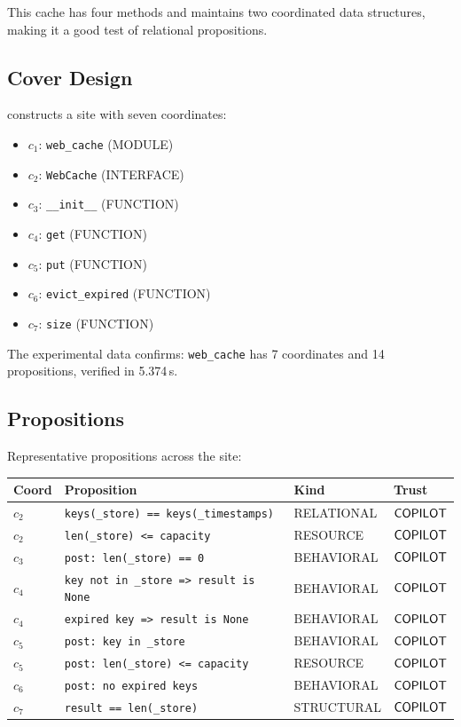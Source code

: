 \documentclass[11pt]{article}
\begin{document}
This cache has four methods and maintains two coordinated data
structures, making it a good test of relational propositions.

\subsection{Cover Design}

\JuGeo{} constructs a site with seven coordinates:
\begin{itemize}
  \item $c_1$: \texttt{web\_cache} (MODULE)
  \item $c_2$: \texttt{WebCache} (INTERFACE)
  \item $c_3$: \texttt{\_\_init\_\_} (FUNCTION)
  \item $c_4$: \texttt{get} (FUNCTION)
  \item $c_5$: \texttt{put} (FUNCTION)
  \item $c_6$: \texttt{evict\_expired} (FUNCTION)
  \item $c_7$: \texttt{size} (FUNCTION)
\end{itemize}

The experimental data confirms: \texttt{web\_cache} has 7 coordinates
and 14 propositions, verified in 5.374\,s.

\subsection{Propositions}

Representative propositions across the site:

\begin{center}
\small
\begin{tabular}{@{}llll@{}}
\toprule
\textbf{Coord} & \textbf{Proposition} & \textbf{Kind} & \textbf{Trust} \\
\midrule
$c_2$ & \texttt{keys(\_store) == keys(\_timestamps)} & RELATIONAL & $\mathsf{COPILOT}$ \\
$c_2$ & \texttt{len(\_store) <= capacity} & RESOURCE & $\mathsf{COPILOT}$ \\
$c_3$ & \texttt{post: len(\_store) == 0} & BEHAVIORAL & $\mathsf{COPILOT}$ \\
$c_4$ & \texttt{key not in \_store => result is None} & BEHAVIORAL & $\mathsf{COPILOT}$ \\
$c_4$ & \texttt{expired key => result is None} & BEHAVIORAL & $\mathsf{COPILOT}$ \\
$c_5$ & \texttt{post: key in \_store} & BEHAVIORAL & $\mathsf{COPILOT}$ \\
$c_5$ & \texttt{post: len(\_store) <= capacity} & RESOURCE & $\mathsf{COPILOT}$ \\
$c_6$ & \texttt{post: no expired keys} & BEHAVIORAL & $\mathsf{COPILOT}$ \\
$c_7$ & \texttt{result == len(\_store)} & STRUCTURAL & $\mathsf{COPILOT}$ \\
\bottomrule
\end{tabular}
\end{center}
\end{document}
